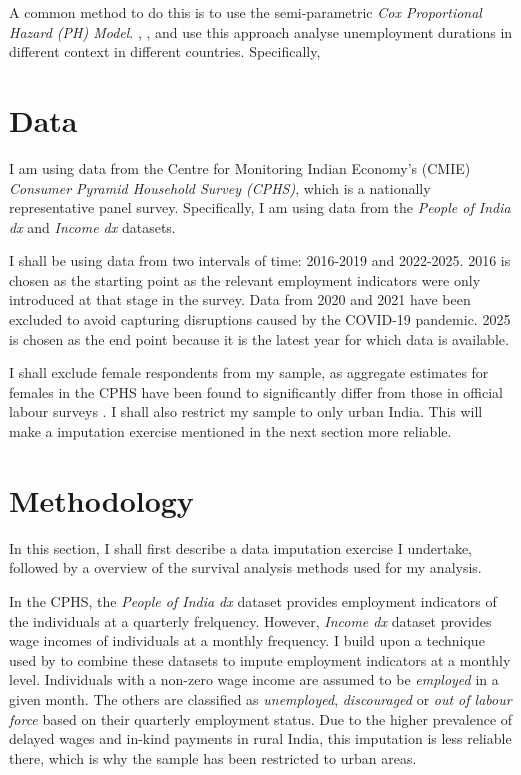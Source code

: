 \documentclass{article}
\begin{document}
A common method to do this is to use the semi-parametric \textit{Cox Proportional Hazard (PH) Model}. \textcite{alemu_yismaw_2026}, \textcite{daniela_circnu_2014}, \textcite{lakuma_et_2016} and \textcite{menon_and_2025} use this approach analyse unemployment durations in different context in different countries. Specifically, 

\section{Data}

I am using data from the Centre for Monitoring Indian Economy’s (CMIE) \textit{Consumer Pyramid Household Survey (CPHS)}, which is a nationally representative panel survey. Specifically, I am using data from the \textit{People of India dx} and \textit{Income dx} datasets. 

I shall be using data from two intervals of time: 2016-2019 and 2022-2025. 2016 is chosen as the starting point as the relevant employment indicators were only introduced at that stage in the survey. Data from 2020 and 2021 have been excluded to avoid capturing disruptions caused by the COVID-19 pandemic. 2025 is chosen as the end point because it is the latest year for which data is available. 

I shall exclude female respondents from my sample, as aggregate estimates for females in the CPHS have been found to significantly differ from those in official labour surveys \parencite{abraham_shrivastava_2022}. I shall also restrict my sample to only urban India. This will make a imputation exercise mentioned in the next section more reliable.

\section{Methodology}

In this section, I shall first describe a data imputation exercise I undertake, followed by a overview of the survival analysis methods used for my analysis.

In the CPHS, the \textit{People of India dx} dataset provides employment indicators of the individuals at a quarterly frelquency. However, \textit{Income dx} dataset provides wage incomes of individuals at a monthly frequency. I build upon a technique used by \textcite{kannan_2025} to combine these datasets to impute employment indicators at a monthly level. Individuals with a non-zero wage income are assumed to be \textit{employed} in a given month. The others are classified as \textit{unemployed}, \textit{discouraged} or \textit{out of labour force} based on their quarterly employment status. Due to the higher prevalence of delayed wages and in-kind payments in rural India, this imputation is less reliable there, which is why the sample has been restricted to urban areas.
\end{document}
